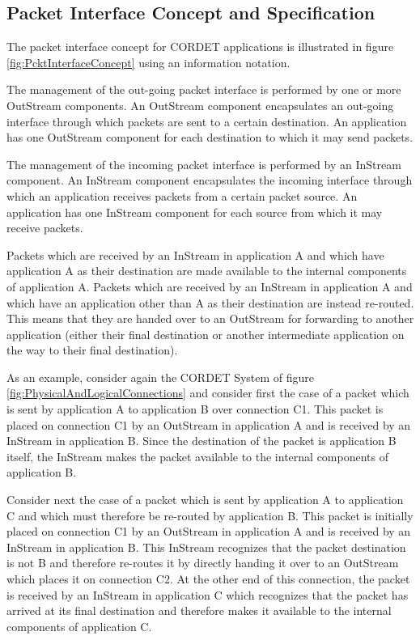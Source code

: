\documentclass[a4paper,10pt]{article}
\begin{document}
\subsection{Packet Interface Concept and Specification}\label{sec:PcktInterfaceConcept}

The packet interface concept for CORDET applications is illustrated in figure \ref{fig:PcktInterfaceConcept} using an information notation.

The management of the out-going packet interface is performed by one or more OutStream components. An OutStream component encapsulates an out-going interface through which packets are sent to a certain destination. An application has one OutStream component for each destination to which it may send packets.

The management of the incoming packet interface is performed by an InStream component. An InStream component encapsulates the incoming interface through which an application receives packets from a certain packet source. An application has one InStream component for each source from which it may receive packets.

Packets which are received by an InStream in application A and which have application A as their destination are made available to the internal components of application A. Packets which are received by an InStream in application A and which have an application other than A as their destination are instead re-routed. This means that they are handed over to an OutStream for forwarding to another application (either their final destination or another intermediate application on the way to their final destination).

As an example, consider again the CORDET System of figure \ref{fig:PhysicalAndLogicalConnections} and consider first the case of a packet which is sent by application A to application B over connection C1. This packet is placed on connection C1 by an OutStream in application A and is received by an InStream in application B. Since the destination of the packet is application B itself, the InStream makes the packet available to the internal components of application B.

Consider next the case of a packet which is sent by application A to application C and which must therefore be re-routed by application B. This packet is initially placed on connection C1 by an OutStream in application A and is received by an InStream in application B. This InStream recognizes that the packet destination is not B and therefore re-routes it by directly handing it over to an OutStream which places it on connection C2. At the other end of this connection, the packet is received by an InStream in application C which recognizes that the packet has arrived at its final destination and therefore makes it available to the internal components of application C. 
\end{document}
